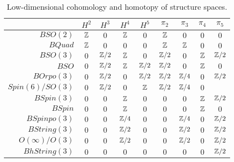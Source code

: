 \documentclass{amsart}
\begin{document}
\begin{table}[!ht]
\begin{tabular}{|r||c|c|c|c||c|c|c|c|}
\hline
& $H^2$ & $H^3$ & $H^4$ & $H^5$ & $\pi_2$ & $\pi_3$ & $\pi_4$ & $\pi_5$ \\
\hline
$BSO(2)$ %
& $\mathbb Z$ & $0$ & $\mathbb Z$ & $0$ 
& $\mathbb Z$ & $0$ & $0$ & $0$ \\
$BQuad$ %
& $\mathbb Z$ & $0$ & $0$ & $0$
& $\mathbb Z$ & $\mathbb Z$ & $0$ & $0$ \\
$BSO(3)$ %
& $0$ & $\mathbb Z/2$ & $\mathbb Z$ & $0$
& $\mathbb Z/2$ & $0$ & $\mathbb Z$ & $\mathbb Z/2$ \\ %
$BSO$
& $0$ & $\mathbb Z/2$ & $\mathbb Z$ & $\mathbb Z/2$ %
& $\mathbb Z/2$ & $0$ & $\mathbb Z$ & $0$ \\ %
$BOrpo(3)$ %
& $0$ & $\mathbb Z/2$ & $0$ & $\mathbb Z/2$ 
& $\mathbb Z/2$ & $\mathbb Z/4$ & $0$ & $\mathbb Z/2$  \\
$Spin(6)/SO(3)$ %
& $0$ & $\mathbb Z/2$ & $0$ & $\mathbb Z$ %
& $\mathbb Z/2$ & $\mathbb Z/4$ & $0$ & \CDcomm{$??$} \\
$BSpin(3)$ %
& $0$ & $0$ & $\mathbb Z$ & $0$
& $0$ & $0$ & $\mathbb Z$ & $\mathbb Z/2$ \\
$BSpin$
& $0$ & $0$ & $\mathbb Z$ & $0$ %
& $0$ & $0$ & $\mathbb Z$ & $0$ \\ %
$BSpinpo(3)$
& $0$ & $0$ & $\mathbb Z/4$ & $0$
& $0$ & $\mathbb Z/4$ & $0$ & $\mathbb Z/2$ \\
$BString(3)$ %
& $0$ & $0$ & $\mathbb Z/2$ & $0$
& $0$ & $\mathbb Z/2$ & $0$ & $\mathbb Z/2$ \\
$O(\infty)/O(3)$ %
& $0$ & $0$ & $\mathbb Z/2$ & $0$
& $0$ & $\mathbb Z/2$ & $0$ & $\mathbb Z/2$ \\
$BhString(3)$ %
& $0$ & $0$ & $0$ & $0$
& $0$ & $0$ & $0$ & $\mathbb Z/2$ \\
\hline 
\end{tabular} \vspace*{8pt}
\caption{Low-dimensional cohomology and homotopy of structure spaces.} \label{table-structurecalc}
\end{table} 
\end{document}
